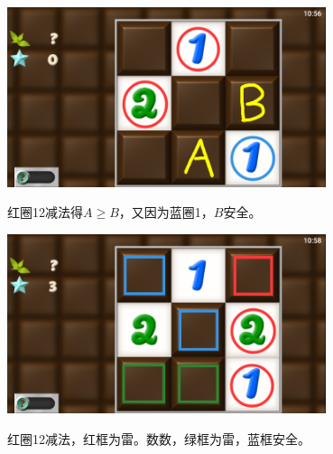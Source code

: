 \subsection{} %
\begin{center}
    \includegraphics[width=0.7\textwidth]{puzzle/13-1.png}
\end{center}
红圈12减法得$A\ge B$，又因为蓝圈1，$B$安全。
\begin{center}
    \includegraphics[width=0.7\textwidth]{puzzle/13-2.png}
\end{center}
红圈12减法，红框为雷。数数，绿框为雷，蓝框安全。

